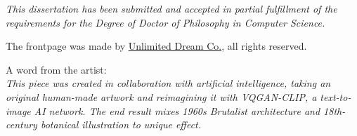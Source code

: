 
\vspace*{\fill}
\vspace*{\fill}
\vspace*{\fill}
\begin{center}
\textit{
This dissertation has been submitted and accepted in partial fulfillment of
the requirements for the Degree of Doctor of Philosophy in
Computer Science.
}
\end{center}

\vspace*{\fill}
\vspace*{\fill}
\vspace*{\fill}

\newpage

\vspace*{\fill}
\vspace*{\fill}
\vspace*{\fill}
\begin{center}
The frontpage was made by \href{https://www.unlimiteddreamco.xyz/}{Unlimited Dream Co.}, all rights reserved.\\
\end{center}
A word from the artist: \\
\textit{This piece was created in collaboration with artificial intelligence, taking an original human-made artwork and reimagining it with VQGAN-CLIP, a text-to-image AI network. The end result mixes 1960s Brutalist architecture and 18th-century botanical illustration to unique effect.}
\vspace*{\fill}
\vspace*{\fill}
\vspace*{\fill}
